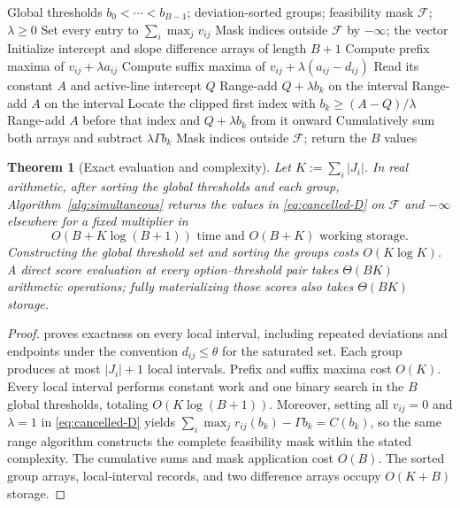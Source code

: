 \documentclass[11pt]{article}
\theoremstyle{plain}
\newtheorem{theorem}{Theorem}
\theoremstyle{definition}
\theoremstyle{remark}
\begin{document}
\begin{algorithm}[!htbp]
\caption{One simultaneous multiplier evaluation}\label{alg:simultaneous}
\small
\begin{algorithmic}[1]
\Require Global thresholds $b_0<\cdots<b_{B-1}$; deviation-sorted groups; feasibility mask $\mathcal F$; $\lambda\ge0$
  \State Set every entry to $\sum_i\max_j v_{ij}$
  \State Mask indices outside $\mathcal F$ by $-\infty$; \Return the vector
\EndIf
\State Initialize intercept and slope difference arrays of length $B+1$
  \State Compute prefix maxima of $v_{ij}+\lambda a_{ij}$
  \State Compute suffix maxima of $v_{ij}+\lambda(a_{ij}-d_{ij})$
    \State Read its constant $A$ and active-line intercept $Q$
      \State Range-add $Q+\lambda b_k$ on the interval
      \State Range-add $A$ on the interval
    \Else
      \State Locate the clipped first index with $b_k\ge(A-Q)/\lambda$
      \State Range-add $A$ before that index and $Q+\lambda b_k$ from it onward
    \EndIf
  \EndFor
\EndFor
\State Cumulatively sum both arrays and subtract $\lambda\Gamma b_k$
\State Mask indices outside $\mathcal F$; return the $B$ values
\end{algorithmic}
\end{algorithm}

\begin{theorem}[Exact evaluation and complexity]\label{thm:complexity}
Let $K:=\sum_i|J_i|$.  In real arithmetic, after sorting the global thresholds and each group, Algorithm~\ref{alg:simultaneous} returns the values in \eqref{eq:cancelled-D} on $\mathcal F$ and $-\infty$ elsewhere for a fixed multiplier in
\[
O(B+K\log(B+1))\text{ time and }O(B+K)\text{ working storage}.
\]
Constructing the global threshold set and sorting the groups costs $O(K\log K)$.  A direct score evaluation at every option--threshold pair takes $\Theta(BK)$ arithmetic operations; fully materializing those scores also takes $\Theta(BK)$ storage.
\end{theorem}
\begin{proof}
 proves exactness on every local interval, including repeated deviations and endpoints under the convention $d_{ij}\le\theta$ for the saturated set.  Each group produces at most $|J_i|+1$ local intervals.  Prefix and suffix maxima cost $O(K)$.  Every local interval performs constant work and one binary search in the $B$ global thresholds, totaling $O(K\log(B+1))$.  Moreover, setting all $v_{ij}=0$ and $\lambda=1$ in \eqref{eq:cancelled-D} yields $\sum_i\max_j r_{ij}(b_k)-\Gamma b_k=C(b_k)$, so the same range algorithm constructs the complete feasibility mask within the stated complexity.  The cumulative sums and mask application cost $O(B)$.  The sorted group arrays, local-interval records, and two difference arrays occupy $O(K+B)$ storage.
\end{proof}
\end{document}
